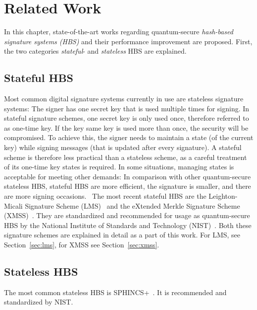 \chapter{Related Work}
\label{cha:stateOfTheArt}

In this chapter, state-of-the-art works regarding quantum-secure \textit{hash-based signature systems (HBS)} and their performance improvement are proposed. 
First, the two categories \textit{stateful}- and \textit{stateless} HBS are explained. %

\section{Stateful HBS} %
Most common digital signature systems currently in use are stateless signature systems: The signer has one secret key that is used multiple times for signing. In stateful signature schemes, one secret key is only used once, therefore referred to as one-time key. If the key same key is used more than once, the security will be compromised. 
To achieve this, the signer needs to maintain a state (of the current key) while signing messages (that is updated after every signature).
A stateful scheme is therefore less practical than a stateless scheme, as a careful treatment of its one-time key states is required. 
In some situations, managing states is acceptable for meeting other demands: In comparison with other quantum-secure stateless HBS, stateful HBS are more efficient, the signature is smaller, and there are more signing occasions.~\cite{properties_stateless_HBS_2022}
The most recent stateful HBS are the  Leighton-Micali Signature Scheme (LMS)~\cite{LMS_RFC8554} and the eXtended Merkle Signature Scheme (XMSS)~\cite{xmss_RFC8391}. They are standardized and recommended for usage as quantum-secure HBS by the National Institute of Standards and Technology (NIST)~\cite{stateful_hashbased_sign_schemes_NIST_2020}. Both these signature schemes are explained in detail as a part of this work. For LMS, see Section~\ref{sec:lms}, for XMSS see Section~\ref{sec:xmss}.

\section{Stateless HBS}
The most common stateless HBS is SPHINCS+~\cite{tweakable_basispaper_sphincs_2019}. It is recommended and standardized by NIST. 

